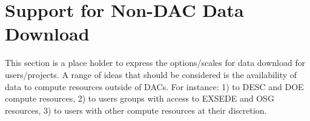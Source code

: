 \section{Support for Non-DAC Data Download\label{sec_users}}

This section is a place holder to express the options/scales for data download for users/projects.
A range of ideas that should be considered is the availability of data to compute resources outside of DACs.
For instance: 1) to DESC and DOE compute resources, 2) to users groups with access to EXSEDE and OSG 
resources, 3) to users with other compute resources at their discretion.






